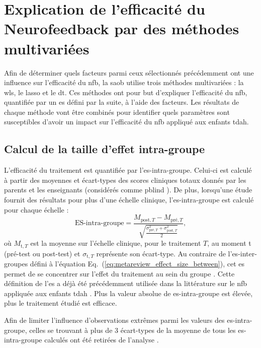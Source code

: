 \section{Explication de l'efficacité du Neurofeedback par des méthodes multivariées}

Afin de déterminer quels facteurs parmi ceux sélectionnés précédemment ont une influence sur l'efficacité du \gls{nfb}, la \gls{saob} utilise trois méthodes multivariées : 
la \gls{wls}, le \gls{lasso} et le \gls{dt}. Ces méthodes ont pour but d'expliquer l'efficacité du \gls{nfb}, quantifiée par un \gls{es}
défini par la suite, à l'aide des facteurs. Les résultats de chaque méthode vont être combinés pour identifier quels paramètres sont susceptibles 
d'avoir un impact sur l'efficacité du \gls{nfb} appliqué aux enfants \gls{tdah}. 

\subsection{Calcul de la taille d'effet intra-groupe} \label{es_within}

L'efficacité du traitement est quantifiée par l'\gls{es}-intra-groupe. Celui-ci est calculé à partir des moyennes et écart-types des scores 
cliniques totaux donnés par les parents et les enseignants (considérés comme \gls{pblind} \citep{Sonuga-Barke2013, Micoulaud2014, Cortese2016}). De plus, 
lorsqu'une étude fournit des résultats pour plus d'une échelle clinique, l'\gls{es}-intra-groupe est calculé pour chaque échelle :
\begin{equation}
\label{eq:factors_effect_size_within_subject}
\text{ES-intra-groupe} = \frac{M_{\text{post},T} - M_{\text{pré},T}}{\sqrt{\frac{\sigma_{\text{pré},T}^2 + \sigma_{\text{post},T}^2}{2}}},
\end{equation} 
\noindent où $M_{\text{t},T}$ est la moyenne sur l'échelle clinique, pour le traitement $T$, au moment t (pré-test ou post-test) et $\sigma_{\text{t},T}$ représente
son écart-type. Au contraire de l'\gls{es}-inter-groupes défini à l'équation Eq.~(\ref{eq:metareview_effect_size_between}), cet \gls{es} permet de se concentrer sur l'effet du 
traitement au sein du groupe \citep{Cohen1988}. Cette définition de l'\gls{es} a déjà été précédemment utilisée dans la littérature sur le \gls{nfb} 
appliquée aux enfants \gls{tdah} \citep{Arns2009, Maurizio2014, Strehl2017}. Plus la valeur absolue de \gls{es}-intra-groupe est élevée, plus
le traitement étudié est efficace. 

Afin de limiter l'influence d'observations extrêmes parmi les valeurs des \gls{es}-intra-groupe, celles se trouvant à plus de 3 écart-types de la moyenne
de tous les \gls{es}-intra-groupe calculés ont été retirées de l'analyse \citep{Shewhart1931}.

